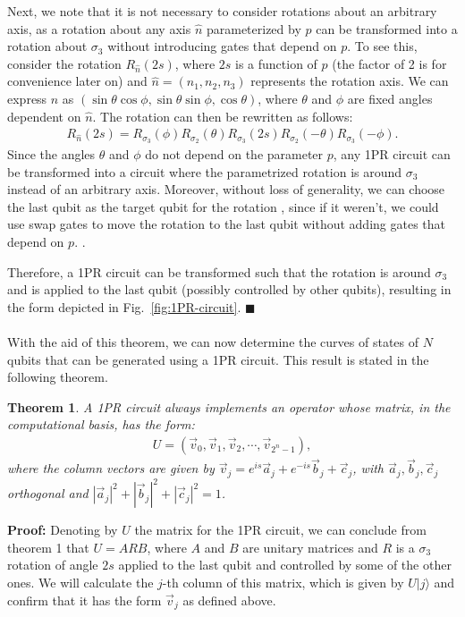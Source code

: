\documentclass[10pt,letterpaper]{article} %
\newcommand{\fref}[1]{Fig.~\ref{#1}}
\newtheorem{theorem}{Theorem}
\begin{document}
Next, we note that it is not necessary to consider rotations about an arbitrary axis,
as a rotation about any axis $\hat{n}$ parameterized by $p$
can be transformed into a rotation about $\sigma_3$ without introducing 
gates that depend on $p$. To see this, consider the rotation $R_{\hat{n}}(2s)$, where $2s$ 
is a function of $p$ (the factor of 2 is for convenience later on) 
and $\hat{n} = (n_1,n_2,n_3)$ represents the rotation axis. 
We can express $\hat{n}$ as $(\sin \theta \cos \phi, \sin \theta \sin \phi, \cos \theta)$, 
where $\theta$ and $\phi$ are fixed angles dependent on $\hat{n}$. 
The rotation can then be rewritten as follows:
\begin{eqnarray}
R_{\hat{n}}(2s) = R_{\sigma_3}(\phi) R_{\sigma_2}(\theta) R_{\sigma_3}(2s) R_{\sigma_2}(-\theta) R_{\sigma_3}(-\phi).
\end{eqnarray}
Since the angles $\theta$ and $\phi$ do not depend on the parameter $p$,
any 1PR circuit can be transformed into a circuit where the parametrized
 rotation is around $\sigma_3$ instead of an arbitrary axis. 
Moreover, without loss of generality, we can choose the last qubit as the
target qubit for the rotation  
{\color{orange} , since if it weren't, we could use
swap gates to move the rotation
to the last qubit without adding gates
that depend on $p$. }.

Therefore, a 1PR circuit can be transformed such
that the rotation is around $\sigma_3$ and is applied to the last qubit 
(possibly controlled by other qubits), 
resulting in the form depicted in \fref{fig:1PR-circuit}. 
 
$\blacksquare$ \\
$\;$\\

With the aid of this theorem, we can now determine the curves
of states of $N$ qubits that can be generated using a 1PR circuit. 
This result is stated in the following theorem.

\begin{theorem}
A 1PR circuit always implements an operator whose matrix,
in the computational basis, has the form:
\begin{eqnarray}
U = (\vec{v}_0, \vec{v}_1, \vec{v}_2, \cdots, \vec{v}_{2^n-1}),
\end{eqnarray}
where the column vectors are given by $\vec{v}_j = e^{is} \vec{a}_j + e^{-is} \vec{b}_j + \vec{c}_j$,
with $\vec{a}_j ,\vec{b}_j, \vec{c}_j$ orthogonal and $|\vec{a}_j|^2 + |\vec{b}_j|^2 + |\vec{c}_j|^2 = 1$.
\end{theorem}
\textbf{Proof:} 
Denoting by $U$ the matrix for the 1PR circuit,
we can conclude from theorem 1 that $U=ARB$,
where $A$ and $B$ are unitary matrices and $R$ is a $\sigma_3$ rotation of angle $2s$
applied to the last qubit and controlled by some of the other
ones. 
We will calculate the $j$-th column of this matrix,
which is given by $U|j\rangle$
and confirm that it has the form $\vec{v}_j$ as defined above.
\end{document}

